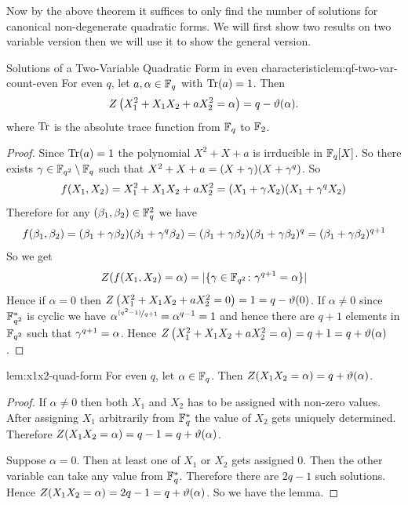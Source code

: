 Now by the above theorem it suffices to only find the number of solutions for canonical non-degenerate quadratic forms. We will first show two results on two variable version then we will use it to show the general version. 
\begin{lemma}{Solutions of a Two-Variable Quadratic Form in even characteristic}{lem:qf-two-var-count-even}
  For even $q$, let $a,\alpha\in\mathbb{F}_q$ with $\operatorname{Tr}(a)=1$. Then $$Z\left(X_1^2+X_1X_2+aX_2^2=\alpha\right)=q-\vartheta(\alpha).$$where $\operatorname{Tr}$ is the absolute trace function from $\mathbb{F}_q$ to $\mathbb{F}_2$. 
\end{lemma}
\begin{proof}
  Since $\operatorname{Tr}(a)=1$ the polynomial $X^2+X+a$ is irrducible in $\mathbb{F}_q[X]$. So there exists $\gamma\in\mathbb{F}_{q^2}\setminus\mathbb{F}_q$ such that $X^2+X+a=(X+\gamma)(X+\gamma^q)$. So $$f(X_1,X_2)=X_1^2+X_1X_2+aX_2^2=(X_1+\gamma X_2)(X_1+\gamma^q X_2)$$Therefore for any $(\beta_1,\beta_2)\in\mathbb{F}_q^2$ we have $$f(\beta_1,\beta_2)=(\beta_1+\gamma\beta_2)(\beta_1+\gamma^q\beta_2)=(\beta_1+\gamma\beta_2)(\beta_1+\gamma\beta_2)^q=(\beta_1+\gamma\beta_2)^{q+1}$$So we get $$Z(f(X_1,X_2)=\alpha)=|\{\gamma\in\mathbb{F}_{q^2}\colon \gamma^{q+1}=\alpha\}|$$Hence if $\alpha=0$ then $Z\left(X_1^2+X_1X_2+aX_2^2=0\right)=1=q-\vartheta(0)$. If $\alpha\neq 0$ since $\mathbb{F}_{q^2}^*$ is cyclic we have $\alpha^{\nicefrac{(q^2-1)}{q+1}}=\alpha^{q-1}=1$ and hence there are $q+1$ elements in $\mathbb{F}_{q^2}$ such that $\gamma^{q+1}=\alpha$. Hence $Z\left(X_1^2+X_1X_2+aX_2^2=\alpha\right)=q+1=q+\vartheta(\alpha)$.
\end{proof}
\begin{lemma}{}{lem:x1x2-quad-form}
  For even $q$, let $\alpha\in\mathbb{F}_q$. Then $Z(X_1X_2=\alpha)=q+\vartheta(\alpha)$. 
\end{lemma}
\begin{proof}
  If $\alpha\neq 0$ then both $X_1$ and $X_2$ has to be assigned with non-zero values. After assigning $X_1$ arbitrarily from $\mathbb{F}_q^*$ the value of $X_2$ gets uniquely determined. Therefore $Z(X_1X_2=\alpha)=q-1=q+\vartheta(\alpha)$. 

  Suppose $\alpha=0$. Then at least one of $X_1$ or $X_2$ gets assigned $0$. Then the other variable can take any value from $\mathbb{F}_q^*$. Therefore there are $2q-1$ such solutions. Hence $Z(X_1X_2=\alpha)=2q-1=q+\vartheta(\alpha)$. So we have the lemma. 
\end{proof}
